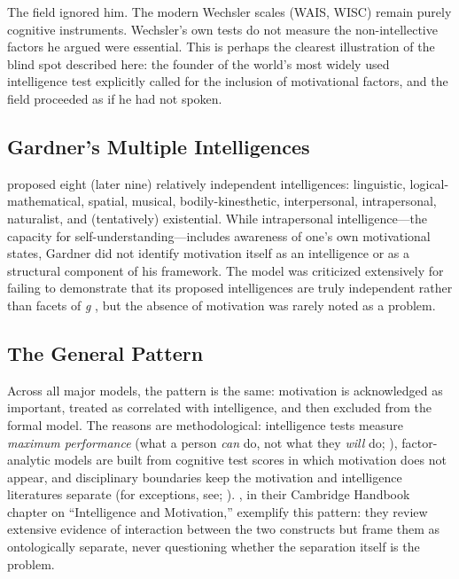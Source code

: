 \documentclass[12pt,a4paper]{article}
\begin{document}
The field ignored him. The modern Wechsler scales (WAIS, WISC) remain purely cognitive instruments. Wechsler's own tests do not measure the non-intellective factors he argued were essential. This is perhaps the clearest illustration of the blind spot described here: the founder of the world's most widely used intelligence test explicitly called for the inclusion of motivational factors, and the field proceeded as if he had not spoken.

\subsection{Gardner's Multiple Intelligences}

\citet{Gardner1983} proposed eight (later nine) relatively independent intelligences: linguistic, logical-mathematical, spatial, musical, bodily-kinesthetic, interpersonal, intrapersonal, naturalist, and (tentatively) existential. While intrapersonal intelligence---\hspace{0pt}the capacity for self-understanding---\hspace{0pt}includes awareness of one's own motivational states, Gardner did not identify motivation itself as an intelligence or as a structural component of his framework. The model was criticized extensively for failing to demonstrate that its proposed intelligences are truly independent rather than facets of \emph{g} \citep{Waterhouse2006}, but the absence of motivation was rarely noted as a problem.

\subsection{The General Pattern}

Across all major models, the pattern is the same: motivation is acknowledged as important, treated as correlated with intelligence, and then excluded from the formal model. The reasons are methodological: intelligence tests measure \emph{maximum performance} (what a person \emph{can} do, not what they \emph{will} do; \citealp{Cronbach1949}), factor-analytic models are built from cognitive test scores in which motivation does not appear, and disciplinary boundaries keep the motivation and intelligence literatures separate (for exceptions, see; \citealp{Murayama2013,CredeKuncel2008}). \citet{CarrDweck2019}, in their Cambridge Handbook chapter on ``Intelligence and Motivation,'' exemplify this pattern: they review extensive evidence of interaction between the two constructs but frame them as ontologically separate, never questioning whether the separation itself is the problem.
\end{document}
